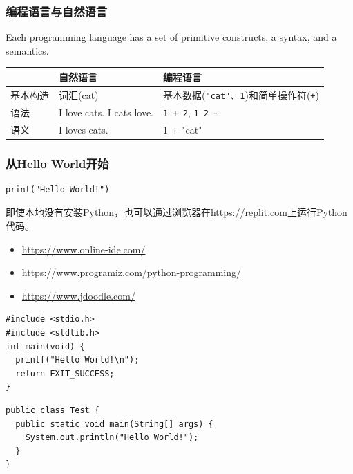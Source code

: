 \documentclass[aspectratio=169, 14pt]{beamer}
\begin{document}
\begin{frame}
	\frametitle{编程语言与自然语言}
	Each programming language has a set of primitive constructs, a syntax, and a semantics.

	\begin{tabular}{l l p{2in}}
		\toprule
		     & \textbf{自然语言}                     & \textbf{编程语言}                                       \\
		\midrule
		基本构造 & 词汇(cat)                           & 基本数据(\texttt{"cat"}、\texttt{1})和简单操作符({\texttt{+}}) \\
		语法   & I love cats. \alert{I cats love}. & \texttt{1 + 2}, \alert{\texttt{1 2 +}}              \\
		语义   & \alert{I loves cats}.             & \alert{1 + "cat"}                                   \\
		\bottomrule
	\end{tabular}

\end{frame}

\begin{frame}[fragile]
	\frametitle{从Hello World开始}
	\begin{verbatim}
print("Hello World!")
  \end{verbatim}
	即使本地没有安装Python，也可以通过浏览器在\url{https://replit.com}上运行Python代码。
	\begin{itemize}
		\item \url{https://www.online-ide.com/}
		\item \url{https://www.programiz.com/python-programming/}
		\item \url{https://www.jdoodle.com/}
	\end{itemize}

\end{frame}

\begin{frame}[fragile]

	\begin{verbatim}
#include <stdio.h>
#include <stdlib.h>
int main(void) {
  printf("Hello World!\n");
  return EXIT_SUCCESS;
}
  \end{verbatim}

	\begin{verbatim}
public class Test {
  public static void main(String[] args) {
    System.out.println("Hello World!");
  }
}
  \end{verbatim}
\end{frame}
\end{document}
